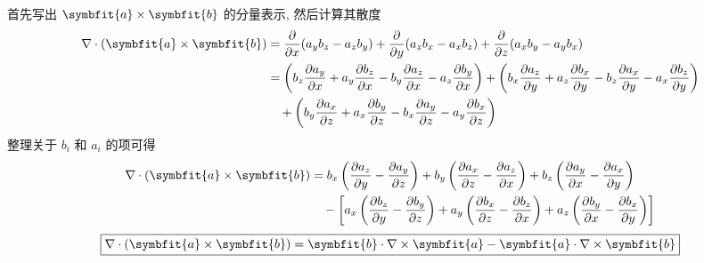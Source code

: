 \begin{myproof}
    首先写出 $\symbfit{a} \times \symbfit{b}$ 的分量表示, 然后计算其散度
    \begin{equation}
        \begin{aligned}
            \nabla \cdot (\symbfit{a} \times \symbfit{b}) & = \frac{\partial}{\partial x}(a_y b_z - a_z b_y) + \frac{\partial}{\partial y}(a_z b_x - a_x b_z) + \frac{\partial}{\partial z}(a_x b_y - a_y b_x)                                                                                                                                                                                            \\
                                                          & = \left( b_z \frac{\partial a_y}{\partial x} + a_y \frac{\partial b_z}{\partial x} - b_y \frac{\partial a_z}{\partial x} - a_z \frac{\partial b_y}{\partial x} \right) + \left( b_x \frac{\partial a_z}{\partial y} + a_z \frac{\partial b_x}{\partial y} - b_z \frac{\partial a_x}{\partial y} - a_x \frac{\partial b_z}{\partial y} \right) \\
                                                          & \quad + \left( b_y \frac{\partial a_x}{\partial z} + a_x \frac{\partial b_y}{\partial z} - b_x \frac{\partial a_y}{\partial z} - a_y \frac{\partial b_x}{\partial z} \right)
        \end{aligned}
    \end{equation}
    整理关于 $b_i$ 和 $a_i$ 的项可得
    \begin{equation}
        \begin{aligned}
            \nabla \cdot (\symbfit{a} \times \symbfit{b}) & = b_x \left( \frac{\partial a_z}{\partial y} - \frac{\partial a_y}{\partial z} \right) + b_y \left( \frac{\partial a_x}{\partial z} - \frac{\partial a_z}{\partial x} \right) + b_z \left( \frac{\partial a_y}{\partial x} - \frac{\partial a_x}{\partial y} \right)                      \\
                                                          & \quad - \left[ a_x \left( \frac{\partial b_z}{\partial y} - \frac{\partial b_y}{\partial z} \right) + a_y \left( \frac{\partial b_x}{\partial z} - \frac{\partial b_z}{\partial x} \right) + a_z \left( \frac{\partial b_y}{\partial x} - \frac{\partial b_x}{\partial y} \right) \right]
        \end{aligned}
    \end{equation}
    \begin{equation}
        \boxed{\nabla \cdot (\symbfit{a} \times \symbfit{b}) = \symbfit{b} \cdot \nabla \times \symbfit{a} - \symbfit{a} \cdot \nabla \times \symbfit{b}}
    \end{equation}


\end{myproof}
